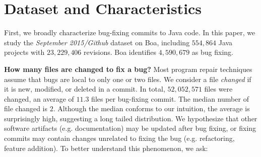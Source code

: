 \documentclass{sig-alternate-05-2015}
\begin{document}
\section{Dataset and Characteristics}

First, we broadly characterize bug-fixing commits to Java code.  In this paper,
we study the \emph{September 2015/Github} dataset on Boa, including $554,864$
Java projects with $23,229,406$ revisions. Boa identifies $4,590,679$ as bug
fixing.

\vspace{1ex}
\noindent\textbf{How many files are changed to fix a bug?}
%
Most
program repair techniques assume that bugs are local to only one or two files.
We consider a file \emph{changed} if it is new, modified, or deleted in a commit. In
total, $52,052,571$ files were changed, an average of $11.3$ files per
bug-fixing commit. The median number of file changed is $2$.  Although the median
conforms to our intuition, the average is surprisingly high, suggesting a long
tailed distribution.   We hypothesize that
other software artifacts (e.g.  documentation) may be updated
after bug  fixing, or fixing commits may contain changes unrelated to fixing
the bug (e.g.  refactoring, feature addition).  To better understand this
phenomenon, we ask:
\end{document}
